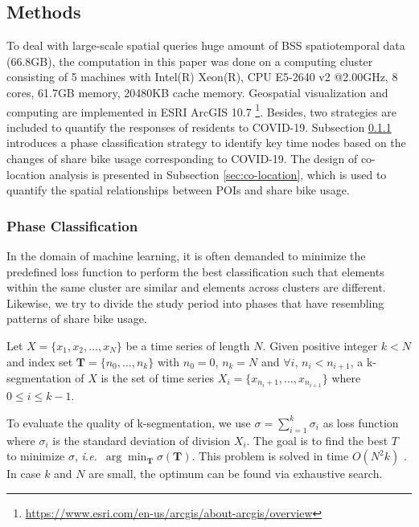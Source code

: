 \documentclass[ijgi,submit,moreauthors,pdftex]{Definitions/mdpi}
\begin{document}
\subsection{Methods}
To deal with large-scale spatial queries huge amount of BSS spatiotemporal data (66.8GB), the computation in this paper was done on a computing cluster consisting of 5 machines with Intel(R) Xeon(R), CPU E5-2640 v2 @2.00GHz, 8 cores, 61.7GB memory, 20480KB cache memory. 
Geospatial visualization and computing are implemented in ESRI ArcGIS 10.7 \footnote{\url{https://www.esri.com/en-us/arcgis/about-arcgis/overview}}.
Besides, two strategies are included to quantify the responses of residents to COVID-19.
Subsection \ref{sec:phase_classification} introduces a phase classification strategy to identify key time nodes based on the changes of share bike usage corresponding to COVID-19.
The design of co-location analysis is presented in Subsection \ref{sec:co-location}, which is used to quantify the spatial relationships between POIs and share bike usage.  

\subsubsection{Phase Classification}\label{sec:phase_classification}
In the domain of machine learning, it is often demanded to minimize the predefined loss function to perform the best classification such that elements within the same cluster are similar and elements across clusters are different.
Likewise, we try to divide the study period into phases that have resembling patterns of share bike usage.

\begin{Definition}[k-segmentation]\label{def:k-seg}
Let $X=\{x_1,x_2,\ldots,x_N\}$ be a time series of length $N$.
Given positive integer $k<N$ and index set $\mathbf{T}=\{n_0,\ldots,n_k\}$ with $n_0=0$, $n_k=N$ and $\forall i$, $n_i<n_{i+1}$, a k-segmentation of $X$ is the set of time series $X_i=\{x_{n_i+1},\ldots,x_{n_{i+1}}\}$ where $0\leq i\leq k-1$.
\end{Definition}

To evaluate the quality of k-segmentation, we use $\sigma=\sum_{i=1}^{k}{\sigma_i}$ as loss function where $\sigma_i$ is the standard deviation of division $X_i$. 
The goal is to find the best $T$ to minimize $\sigma$, \textit{i.e.}\ $\arg\min_{\mathbf{T}}\sigma(\mathbf{T})$.
This problem is solved in time $O(N^2k)$ \cite{terzi2006efficient}.
In case $k$ and $N$ are small, the optimum can be found via exhaustive search.
\end{document}
